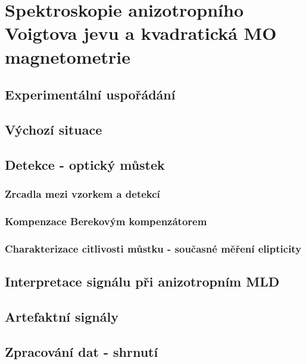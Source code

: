 \chapter{Spektroskopie anizotropního Voigtova jevu a kvadratická MO magnetometrie}\label{k:popis metody}

\cite{Kimak1}\cite{Wohlrath}\cite{Kubascik}\cite{Kimak2}

\section{Experimentální uspořádání}


\section{Výchozí situace}

\section{Detekce - optický můstek}

\subsection{Zrcadla mezi vzorkem a detekcí}

\subsection{Kompenzace Berekovým kompenzátorem}

\subsection{Charakterizace citlivosti můstku - současné měření elipticity}

\section{Interpretace signálu při anizotropním MLD}

\section{Artefaktní signály}

\section{Zpracování dat - shrnutí}